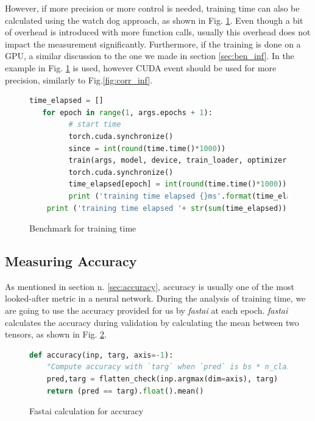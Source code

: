 However, if more precision or more control is needed, training time can also be calculated using the watch dog approach, as shown in Fig. \ref{fig:ben_tra}. Even though a bit of overhead is introduced with more function calls, usually this overhead does not impact the measurement significantly. Furthermore, if the training is done on a GPU, a similar discussion to the one we made in section \ref{sec:ben_inf}. In the example in Fig. \ref{fig:ben_tra} is used, however CUDA event should be used for more precision, similarly to Fig.\ref{fig:corr_inf}. 
\begin{figure}[h]
\begin{lstlisting}[language=python]
   time_elapsed = []
   for epoch in range(1, args.epochs + 1):
         # start time
         torch.cuda.synchronize()
         since = int(round(time.time()*1000))
         train(args, model, device, train_loader, optimizer, epoch)
         torch.cuda.synchronize()
         time_elapsed[epoch] = int(round(time.time()*1000)) - since
         print ('training time elapsed {}ms'.format(time_elapsed[epoch]))
    print ('training time elapsed '+ str(sum(time_elapsed)) + 'ms')
\end{lstlisting}
\caption{Benchmark for training time}
\label{fig:ben_tra}
\end{figure}




\subsection{Measuring Accuracy}
As mentioned in section n. \ref{sec:accuracy}, accuracy is usually one of the most looked-after metric in a neural network. 
During the analysis of training time, we are going to use the accuracy provided for us by \textit{fastai} at each epoch. \textit{fastai} calculates the accuracy during validation by calculating the mean between two tensors, as shown in Fig. \ref{fig:fast_acc}. \cite{fastaidocs}
\begin{figure}[h]
\begin{lstlisting}[language=python]
def accuracy(inp, targ, axis=-1):
    "Compute accuracy with `targ` when `pred` is bs * n_classes"
    pred,targ = flatten_check(inp.argmax(dim=axis), targ)
    return (pred == targ).float().mean()
\end{lstlisting}
\caption{Fastai calculation for accuracy \cite{fastaidocs}}
\label{fig:fast_acc}
\end{figure}














